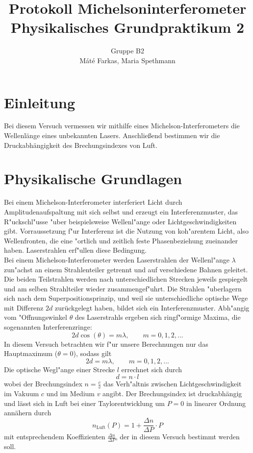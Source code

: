 \documentclass[12pt,a4paper]{article}
\author{Gruppe B2 \\ Máté Farkas, Maria Spethmann}
\title{Protokoll Michelsoninterferometer \\ Physikalisches Grundpraktikum 2}
\begin{document}
	\maketitle
	\thispagestyle{empty} %
	\newpage
	\pagestyle{headings} %
	\tableofcontents
	\newpage


\section{Einleitung}
Bei diesem Versuch vermessen wir mithilfe eines Michelson-Interferometers die Wellenlänge eines unbekannten Lasers. Anschließend bestimmen wir die Druckabhängigkeit des Brechungsindexes von Luft.
\section{Physikalische Grundlagen} 
Bei einem Michelson-Interferometer interferiert Licht durch Amplitudenaufspaltung mit sich selbst und erzeugt ein Interferenzmuster, das R"uckschl"usse "uber beispielsweise Wellenl"ange oder Lichtgeschwindigkeiten gibt. Vorraussetzung f"ur Interferenz ist die Nutzung von koh"arentem Licht, also Wellenfronten, die eine "ortlich und zeitlich feste Phasenbeziehung zueinander haben. Laserstrahlen erf"ullen diese Bedingung.\\
Bei einem Michelson-Interferometer werden Laserstrahlen der Wellenl"ange $\lambda$ zun"achst an einem Strahlenteiler getrennt und auf verschiedene Bahnen geleitet. Die beiden Teilstrahlen werden nach unterschiedlichen Strecken jeweils gespiegelt und am selben Strahlteiler wieder zusammengef"uhrt. Die Strahlen "uberlagern sich nach dem Superpositionsprinzip, und weil sie unterschiedliche optische Wege mit Differenz $2d$ zurückgelegt haben, bildet sich ein Interferenzmuster. Abh"angig vom  "Offnungswinkel $\theta$ des Laserstrahls ergeben sich ringf"ormige Maxima, die sogenannten Interferenzringe:
\begin{equation}\label{eq:Interferenzmuster}
2d\cos(\theta)=m\lambda,\qquad m=0,1,2,...
\end{equation}
In diesem Versuch betrachten wir f"ur unsere Berechnungen nur das Hauptmaximum ($\theta=0$), sodass gilt
\begin{equation}\label{eq:Grundgleichung}
2d=m\lambda,\qquad m=0,1,2,...
\end{equation}
Die optische Wegl"ange einer Strecke $l$ errechnet sich durch 
\begin{equation}\label{eq:d=nl}
d=n\cdot l
\end{equation}
wobei der Brechungsindex $n=\frac{c}{v}$ das Verh"altnis zwischen Lichtgeschwindigkeit im Vakuum $c$ und im Medium $v$ angibt.
Der Brechungsindex ist druckabhängig und lässt sich in Luft bei einer Taylorentwicklung um $P=0$ in linearer Ordnung annähern durch 
\begin{equation}
n_{\text{Luft}}(P)=1+\frac{\Delta n}{\Delta P}\cdot P
\end{equation}
mit entsprechendem Koeffizienten  $\frac{\Delta n}{\Delta P}$, der in diesem Versuch bestimmt werden soll.
\end{document}
